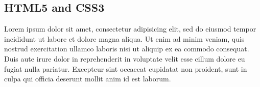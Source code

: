 
\subsection{HTML5 and CSS3} %
\label{sub:html5css3}

Lorem ipsum dolor sit amet, consectetur adipisicing elit, sed do eiusmod tempor incididunt ut labore et dolore magna aliqua. Ut enim ad minim veniam, quis nostrud exercitation ullamco laboris nisi ut aliquip ex ea commodo consequat. Duis aute irure dolor in reprehenderit in voluptate velit esse cillum dolore eu fugiat nulla pariatur. Excepteur sint occaecat cupidatat non proident, sunt in culpa qui officia deserunt mollit anim id est laborum.


